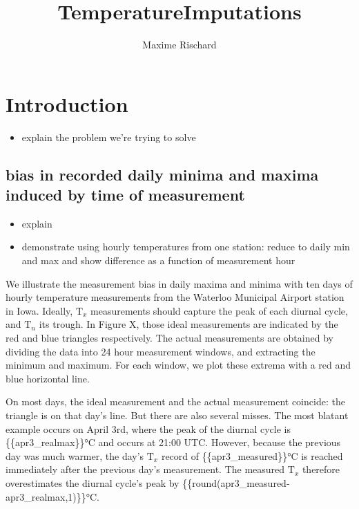\documentclass[letter]{article}
\title{TemperatureImputations}
\author{Maxime Rischard}
\providecommand{\tightlist}{%
      \setlength{\itemsep}{0pt}\setlength{\parskip}{0pt}}
\newcommand{\T}{\mathrm{T}}
\newcommand{\Tn}{\T_{n}}
\newcommand{\Tx}{\T_{x}}
\providecommand{\tightlist}{%
  	  \setlength{\itemsep}{0pt}\setlength{\parskip}{0pt}}
\begin{document}
    
    
    
    \maketitle
    
    
	\tableofcontents


    







    	\section{Introduction}\label{introduction}

\begin{itemize}
\tightlist
\item
  explain the problem we're trying to solve
\end{itemize}

\subsection{bias in recorded daily minima and maxima induced by time of
measurement}\label{bias-in-recorded-daily-minima-and-maxima-induced-by-time-of-measurement}

\begin{itemize}
\tightlist
\item
  explain
\item
  demonstrate using hourly temperatures from one station: reduce to
  daily min and max and show difference as a function of measurement
  hour
\end{itemize}
    


    	We illustrate the measurement bias in daily maxima and minima with ten
days of hourly temperature measurements from the Waterloo Municipal
Airport station in Iowa. Ideally, \(\Tx\) measurements should capture
the peak of each diurnal cycle, and \(\Tn\) its trough. In Figure X,
those ideal measurements are indicated by the red and blue triangles
respectively. The actual measurements are obtained by dividing the data
into 24 hour measurement windows, and extracting the minimum and
maximum. For each window, we plot these extrema with a red and blue
horizontal line.

On most days, the ideal measurement and the actual measurement coincide:
the triangle is on that day's line. But there are also several misses.
The most blatant example occurs on April 3rd, where the peak of the
diurnal cycle is \{\{apr3\_realmax\}\}°C and occurs at 21:00 UTC.
However, because the previous day was much warmer, the day's \(\Tx\)
record of \{\{apr3\_measured\}\}°C is reached immediately after the
previous day's measurement. The measured \(\Tx\) therefore overestimates
the diurnal cycle's peak by
\{\{round(apr3\_measured-apr3\_realmax,1)\}\}°C.
    
\end{document}

